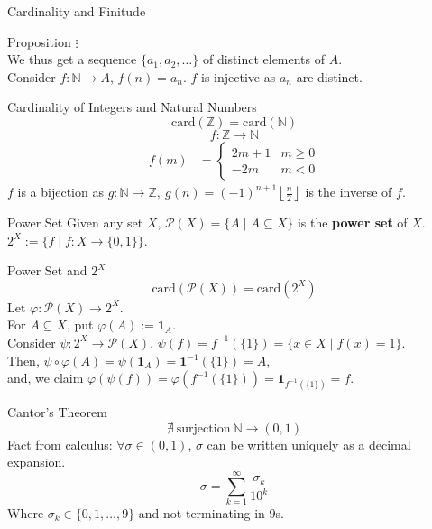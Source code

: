 \documentclass[8pt]{extarticle}
\begin{document}
\begin{problem}{Cardinality and Finitude}
\begin{problem}{Proposition}
      $\vdots$\\

      We thus get a sequence $\{a_1,a_2,\dots\}$ of distinct elements of $A$.\\

      Consider $f:\mathbb{N} \rightarrow A$, $f(n) = a_n$. $f$ is injective as $a_n$ are distinct.
    \end{problem}
    \begin{problem}{Cardinality of Integers and Natural Numbers}
      \[
        \textrm{card}(\mathbb{Z}) = \textrm{card}(\mathbb{N})
      \] 
      \tcblower
      \[
        f:\mathbb{Z} \rightarrow \mathbb{N}
      \] 
      \begin{align*}
        f(m) &= \begin{cases}
          2m + 1 & m\geq 0\\
          -2m & m<0
        \end{cases}
      \end{align*}
      $f$ is a bijection as $g:\mathbb{N} \rightarrow \mathbb{Z},~g(n) = (-1)^{n+1}\left\lfloor \frac{n}{2}\right\rfloor$ is the inverse of $f$.
    \end{problem}
    \begin{problem}{Power Set}
      Given any set $X$, $\mathcal{P}(X) = \{A \mid A\subseteq X\}$ is the \textbf{power set} of $X$.\\

      $2^X:= \{f\mid f:X\rightarrow \{0,1\}\}$.
    \end{problem}
    \begin{problem}{Power Set and $2^{X}$}
      \[
        \textrm{card}(\mathcal{P}(X)) = \textrm{card}(2^X)
      \] 
      \tcblower
      Let $\varphi: \mathcal{P}(X) \rightarrow 2^X$.\\

      For $A\subseteq X$, put $\varphi(A) := \mathbf{1}_A$.\\

      Consider $\psi: 2^X \rightarrow \mathcal{P}(X)$. $\psi(f) = f^{-1}(\{1\}) = \{x\in X \mid f(x) = 1\}$.\\

      Then, $\psi\circ\varphi(A) = \psi(\mathbf{1}_A) = \mathbf{1}^{-1}(\{1\}) = A$,\\

      and, we claim $\varphi(\psi(f)) = \varphi(f^{-1}(\{1\})) = \mathbf{1}_{f^{-1}(\{1\})} = f$.
    \end{problem}
    \begin{problem}{Cantor's Theorem}
      \[
        \nexists~\textrm{surjection}~\mathbb{N}\rightarrow (0,1)
      \] 
      \tcblower
      Fact from calculus: $\forall \sigma\in (0,1)$, $\sigma$ can be written uniquely as a decimal expansion.
      \[
        \sigma = \sum_{k=1}^{\infty} \frac{\sigma_k}{10^k}
      \] 
      Where $\sigma_k\in \{0,1,\dots,9\}$ and not terminating in $9$s.\\


\end{problem}
\end{problem}
\end{document}
